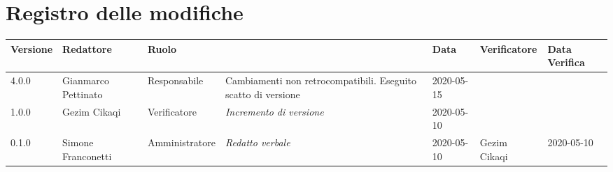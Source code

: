 \section*{Registro delle modifiche}
\renewcommand{\arraystretch}{1.8}

  \setlength\LTleft{-1.7cm}
  \begin{longtable}{|p{1.7cm}|p{2cm}|p{2.5cm}|p{3cm}|p{1.7cm}|p{2cm}|p{2.3cm}|}
    \hline

    \rowcolor{header}
    \textbf{Versione} & \textbf{Redattore} & \textbf{Ruolo} & \centering{\textbf{Descrizione}} & \textbf{Data} & \textbf{Verificatore} & \textbf{Data Verifica}\\

    \hline
	4.0.0 & Gianmarco Pettinato & Responsabile & Cambiamenti non retrocompatibili.  Eseguito scatto di versione & 2020-05-15 & &\\

    1.0.0 & Gezim Cikaqi & Verificatore & \small{\textit{Incremento di versione}} & 2020-05-10 & &\\
	0.1.0 & Simone Franconetti & Amministratore & \small{\textit{Redatto verbale}} & 2020-05-10 & Gezim Cikaqi & 2020-05-10 \\
    \hline
  \end{longtable}
  \setlength\LTleft{0cm}

